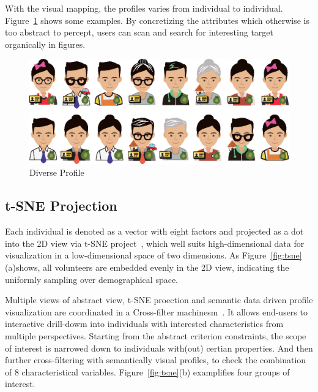 With the visual mapping, the profiles varies from individual to individual. Figure~\ref{fig:div_profile} shows some examples. By concretizing the attributes which otherwise is too abstract to percept, users can scan and search for interesting target organically in figures.

\begin{figure}[htb!]
 \centering %
 \includegraphics[width=\columnwidth]{pictures/design_div}
 \caption{Diverse Profile}
 \label{fig:div_profile}
\end{figure}

\subsection{t-SNE Projection}

Each individual is denoted as a vector with eight factors and projected as a dot into the 2D view via t-SNE project~\cite{maaten2008visualizing}, which well suits high-dimensional data for visualization in a low-dimensional space of two dimensions. As Figure~\ref{fig:tsne}(a)shows, all volunteers are embedded evenly in the 2D view, indicating the uniformly sampling over demographical space. 

Multiple views of abstract view, t-SNE proection and semantic data driven profile visualization are coordinated in a Cross-filter machinesm~\cite{Weaver2010}. It allows end-users to interactive drill-dowm into individuals with interested characteristics from multiple perspectives. Starting from the abstract criterion constraints, the scope of interest is narrowed down to individuals with(out) certian properties. And then further cross-filtering with semantically visual profiles, to check the combination of 8 characteristical variables. Figure~\ref{fig:tsne}(b) examplifies four groups of interest. 

